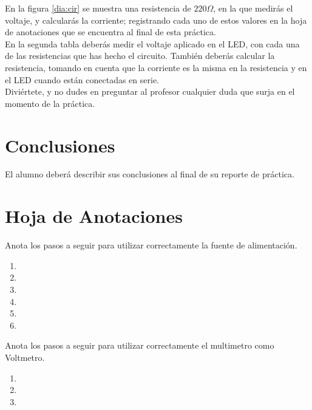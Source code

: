 \documentclass[paper=letter, fontsize=11pt]{scrartcl} %
\numberwithin{equation}{section} %
\numberwithin{figure}{section} %
\numberwithin{table}{section} %
\begin{document}
    En la figura \ref{dia:cir} se muestra una resistencia de $220 \Omega$, en la que medirás el voltaje, y calcularás la corriente; registrando cada uno de estos valores en la hoja de anotaciones que se encuentra al final de esta práctica. \\

    En la segunda tabla deberás medir el voltaje aplicado en el LED, con cada una de las resistencias que has hecho el circuito. También deberás calcular la resistencia, tomando en cuenta que la corriente es la misma en la resistencia y en el LED cuando están conectadas en serie. \\

    Diviértete, y no dudes en preguntar al profesor cualquier duda que surja en el momento de la práctica. \\


\section{Conclusiones}
	El alumno deberá describir sus conclusiones al final de su reporte de práctica.
    

\clearpage
\section{Hoja de Anotaciones}
	Anota los pasos a seguir para utilizar correctamente la fuente de alimentación.

	\begin{enumerate}
		\item
		\item
		\item
		\item
		\item
		\item
	\end{enumerate}

	Anota los pasos a seguir para utilizar correctamente el multimetro como Voltmetro.

	\begin{enumerate}
		\item
		\item
		\item
	\end{enumerate}
\end{document}
